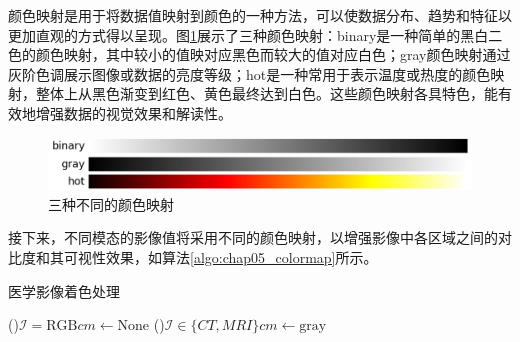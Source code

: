 颜色映射是用于将数据值映射到颜色的一种方法，可以使数据分布、趋势和特征以更加直观的方式得以呈现。图\ref{fig:chap05_colormap}展示了三种颜色映射：binary是一种简单的黑白二色的颜色映射，其中较小的值映对应黑色而较大的值对应白色；gray颜色映射通过灰阶色调展示图像或数据的亮度等级；hot是一种常用于表示温度或热度的颜色映射，整体上从黑色渐变到红色、黄色最终达到白色。这些颜色映射各具特色，能有效地增强数据的视觉效果和解读性。

\begin{figure}[htbp]
  \centering
  \includegraphics[width=\textwidth]{figures/chap05_colormap.jpg}
  \caption{三种不同的颜色映射}
  \label{fig:chap05_colormap}
\end{figure}

接下来，不同模态的影像值将采用不同的颜色映射，以增强影像中各区域之间的对比度和其可视性效果，如算法\ref{algo:chap05_colormap}所示。

\begin{algorithm}
  \caption{医学影像着色处理}
  \label{algo:chap05_colormap}
  \vspace{5pt}

  \lIf(){$\mathcal{I} = \text{RGB}$}{$cm \leftarrow \text{None}$}
  \lElseIf(){$\mathcal{I} \in \{CT,MRI\}$}{$cm \leftarrow \text{gray}$}
\end{algorithm}

